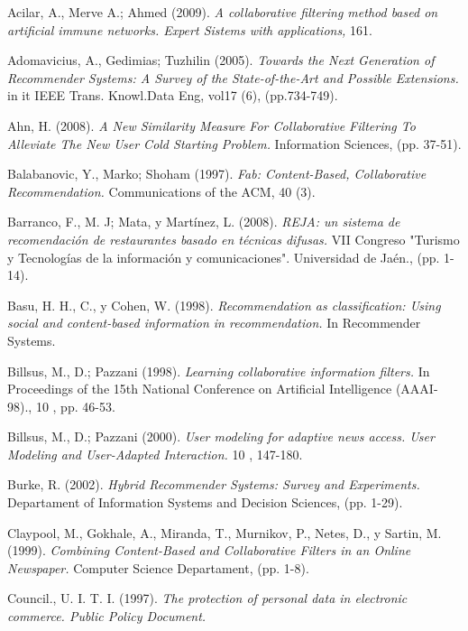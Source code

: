 \documentclass[12pt,letterpaper,oneside] {memoir}
\begin{document}
%
%
\begin{thebibliography}{99}

  Acilar, A., Merve A.; Ahmed (2009). \textit{A collaborative filtering method based on artificial immune networks. Expert Sistems with applications,} 161.

 Adomavicius, A., Gedimias; Tuzhilin (2005). \textit{Towards the Next Generation of Recommender Systems: A Survey of the State-of-the-Art and Possible Extensions.} in it IEEE Trans. Knowl.Data Eng, vol17 (6), (pp.734-749).

 Ahn, H. (2008).\textit{ A New Similarity Measure For Collaborative Filtering To Alleviate The New User Cold Starting Problem.} Information Sciences, (pp. 37-51).

 Balabanovic, Y., Marko; Shoham (1997). \textit{Fab: Content-Based, Collaborative Recommendation.} Communications of the ACM, 40 (3).

 Barranco, F., M. J; Mata, y Martínez, L. (2008). \textit{REJA: un sistema de recomendación de restaurantes basado en técnicas difusas.} VII Congreso "Turismo y Tecnologías de la información y comunicaciones". Universidad de Jaén., (pp. 1-14).

 Basu, H. H., C., y Cohen, W. (1998). \textit{Recommendation as classification: Using social and content-based information in recommendation.} In Recommender Systems.

 Billsus, M., D.; Pazzani (1998).\textit{ Learning collaborative information filters.} In Proceedings of the 15th National Conference on Artificial Intelligence (AAAI-98)., 10 , pp. 46-53.

 Billsus, M., D.; Pazzani (2000). \textit{User modeling for adaptive news access. User Modeling and User-Adapted Interaction.} 10 , 147-180.

 Burke, R. (2002). \textit{Hybrid Recommender Systems: Survey and Experiments.} Departament of Information Systems and Decision Sciences, (pp. 1-29).

 Claypool, M., Gokhale, A., Miranda, T., Murnikov, P., Netes, D., y Sartin, M. (1999). \textit{Combining Content-Based and Collaborative Filters in an Online Newspaper. } Computer Science Departament, (pp. 1-8).

 Council., U. I. T. I. (1997). \textit{The protection of personal data in electronic commerce. Public Policy Document. }


\end{thebibliography}
\end{document}
